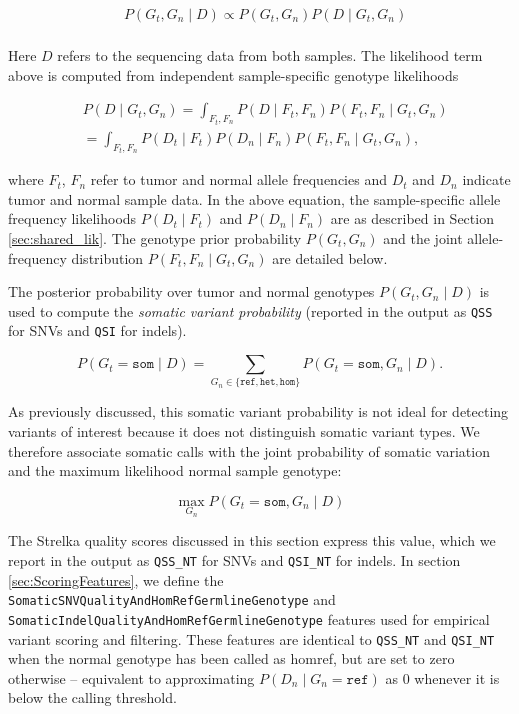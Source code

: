 \documentclass{article}
\begin{document}
\begin{align*}
	& P(G_t,G_n \mid D) \propto P(G_t,G_n) P(D \mid G_t,G_n) \\
\end{align*}


Here $D$ refers to the sequencing data from both samples. The likelihood term above is computed from independent sample-specific genotype likelihoods

\begin{align*}
	& P(D \mid G_t,G_n) = \int_{F_t,F_n}{P(D \mid F_t,F_n)P(F_t,F_n \mid G_t,G_n)} \\
	& = \int_{F_t,F_n}{P(D_t \mid F_t)P(D_n \mid F_n)P(F_t,F_n \mid G_t,G_n)},
\end{align*}

\noindent where $F_t$, $F_n$ refer to tumor and normal allele frequencies and $D_t$ and $D_n$ indicate tumor and normal sample data. In the above equation, the sample-specific allele frequency likelihoods $P(D_t \mid F_t)$ and $P(D_n \mid F_n)$ are as described in Section \ref{sec:shared_lik}. The genotype prior probability $P(G_t, G_n)$ and the joint allele-frequency distribution $P(F_t,F_n \mid G_t,G_n)$ are detailed below.

The posterior probability over tumor and normal genotypes $P(G_t,G_n \mid D)$ is used to compute the {\em somatic variant probability} (reported in the output as \texttt{QSS} for SNVs and \texttt{QSI} for indels).

\begin{equation}
\label{eq:somVarProb}
	P(G_t = \texttt{som} \mid D) = \sum_{G_n \in \{ \texttt{ref}, \texttt{het}, \texttt{hom} \}}{P(G_t=\texttt{som},G_n \mid D)}.
\end{equation}

As previously discussed, this somatic variant probability is not ideal for detecting variants of interest because it does not distinguish somatic variant types. We therefore associate somatic calls with the joint probability of somatic variation and the maximum likelihood normal sample genotype:

\begin{equation*}
\max_{G_n} P(G_t = \texttt{som}, G_n \mid D)
\end{equation*}

The Strelka quality scores discussed in this section express this value, which we report in the output as \texttt{QSS\_NT} for SNVs and \texttt{QSI\_NT} for indels. In section \ref{sec:ScoringFeatures}, we define the \texttt{SomaticSNVQualityAndHomRefGermlineGenotype} and \texttt{SomaticIndelQualityAndHomRefGermlineGenotype} features used for empirical variant scoring and filtering. These features are identical to \texttt{QSS\_NT} and \texttt{QSI\_NT} when the normal genotype has been called as homref, but are set to zero otherwise -- equivalent to approximating $P(D_n \mid G_n = \texttt{ref})$ as $0$ whenever it is below the calling threshold.
\end{document}
